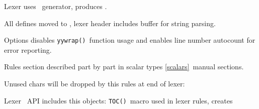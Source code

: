 \label{lexer}

Lexer uses \ generator, produces .
\bigskip

All defines moved to , lexer header includes
buffer for string parsing.


Options disables \verb|yywrap()|\ function usage and enables line number
autocount for error reporting.


Rules section described part by part in scalar types \ref{scalars}\ manual
sections.


Unused chars will be dropped by this rules at end of lexer:


Lexer \cpp\ API includes this objects: \verb|TOC()|\ macro used in lexer rules,
creates 

